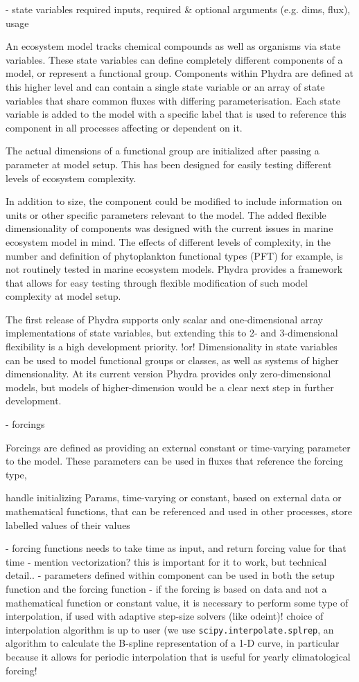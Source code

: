 \documentclass[journal abbreviation, manuscript]{copernicus}
\begin{document}
- state variables
required inputs, required \& optional arguments (e.g. dims, flux), usage

An ecosystem model tracks chemical compounds as well as organisms via state variables. These state variables can define completely different components of a model, or represent a functional group. Components within Phydra are defined at this higher level and can contain a single state variable or an array of state variables that share common fluxes with differing parameterisation. Each state variable is added to the model with a specific label that is used to reference this component in all processes affecting or dependent on it. 

The actual dimensions of a functional group are initialized after passing a parameter at model setup. This has been designed for easily testing different levels of ecosystem complexity.

In addition to size, the component could be modified to include information on units or other specific parameters relevant to the model. The added flexible dimensionality of components was designed with the current issues in marine ecosystem model in mind. The effects of different levels of complexity, in the number and definition of phytoplankton functional types (PFT) for example, is not routinely tested in marine ecosystem models. Phydra provides a framework that allows for easy testing through flexible modification of such model complexity at model setup.

The first release of Phydra supports only scalar and one-dimensional array implementations of state variables, but extending this to 2- and 3-dimensional flexibility is a high development priority. 
!or!
Dimensionality in state variables can be used to model functional groups or classes, as well as systems of higher dimensionality. At its current version Phydra provides only zero-dimensional models, but models of higher-dimension would be a clear next step in further development.

- forcings

Forcings are defined as providing an external constant or time-varying parameter to the model. These parameters can be used in fluxes that reference the forcing type,

handle initializing Params, time-varying or constant, based on external data or mathematical functions, that can be referenced and used in other processes, store labelled values of their values

- forcing functions needs to take time as input, and return forcing value for that time
- mention vectorization? this is important for it to work, but technical detail..
- parameters defined within component can be used in both the setup function and the forcing function
- if the forcing is based on data and not a mathematical function or constant value, it is necessary to perform some type of interpolation, if used with adaptive step-size solvers (like odeint)! choice of interpolation algorithm is up to user (we use \texttt{scipy.interpolate.splrep}, an algorithm to calculate the B-spline representation of a 1-D curve, in particular because it allows for periodic interpolation that is useful for yearly climatological forcing!
\end{document}
